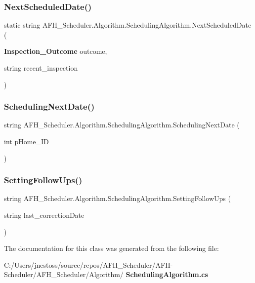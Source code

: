 \mbox{\label{class_a_f_h___scheduler_1_1_algorithm_1_1_scheduling_algorithm_a2c98f9baf4e9e5aff8d36e0066ab6743}} 
\subsubsection{NextScheduledDate()}
{\footnotesize\ttfamily static string A\+F\+H\+\_\+\+Scheduler.\+Algorithm.\+Scheduling\+Algorithm.\+Next\+Scheduled\+Date (\begin{DoxyParamCaption}\item[{\textbf{ Inspection\+\_\+\+Outcome}}]{outcome,  }\item[{string}]{recent\+\_\+inspection }\end{DoxyParamCaption})\hspace{0.3cm}{\ttfamily [static]}}

\mbox{\label{class_a_f_h___scheduler_1_1_algorithm_1_1_scheduling_algorithm_af1f6b5be3788638053a30757496ff021}} 
\subsubsection{SchedulingNextDate()}
{\footnotesize\ttfamily string A\+F\+H\+\_\+\+Scheduler.\+Algorithm.\+Scheduling\+Algorithm.\+Scheduling\+Next\+Date (\begin{DoxyParamCaption}\item[{int}]{p\+Home\+\_\+\+ID }\end{DoxyParamCaption})}

\mbox{\label{class_a_f_h___scheduler_1_1_algorithm_1_1_scheduling_algorithm_add0743684e331fae88d77057fe3fa786}} 
\subsubsection{SettingFollowUps()}
{\footnotesize\ttfamily string A\+F\+H\+\_\+\+Scheduler.\+Algorithm.\+Scheduling\+Algorithm.\+Setting\+Follow\+Ups (\begin{DoxyParamCaption}\item[{string}]{last\+\_\+correction\+Date }\end{DoxyParamCaption})}



The documentation for this class was generated from the following file\+:\begin{DoxyCompactItemize}
\item 
C\+:/\+Users/jnestoss/source/repos/\+A\+F\+H\+\_\+\+Scheduler/\+A\+F\+H-\/\+Scheduler/\+A\+F\+H\+\_\+\+Scheduler/\+Algorithm/\textbf{ Scheduling\+Algorithm.\+cs}\end{DoxyCompactItemize}
